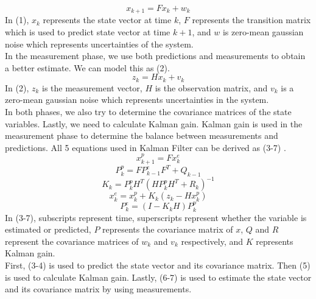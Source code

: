 \documentclass[12pt]{article}
\begin{document}
    \begin{equation}\label{eq:1}
        x_{k+1} = Fx_k + w_k
    \end{equation}
    In (1), \(x_k\) represents the state vector at time \(k\), \(F\) 
    represents the transition matrix which is used to predict state vector 
    at time \(k+1\), and \(w\) is zero-mean gaussian noise which represents 
    uncertainties of the system. \\
    In the measurement phase, we use both predictions and measurements to 
    obtain a better estimate. We can model this as (2).
    \begin{equation}\label{eq:2}
        z_k = Hx_k + v_k
    \end{equation}
    In (2), \(z_k\) is the measurement vector, \(H\) is the observation matrix,
    and \(v_k\) is a zero-mean gaussian noise which represents uncertainties 
    in the system. \\
    In both phases, we also try to determine the covariance matrices of 
    the state variables. Lastly, we need to calculate Kalman gain. 
    Kalman gain is used in the measurement phase to determine the balance 
    between measurements and predictions. All 5 equations used in Kalman 
    Filter can be derived as (3-7) \cite{kalman}.
    \begin{equation}\label{eq:3}
        x^{p}_{k+1} = Fx^{e}_k
    \end{equation}
    \begin{equation}\label{eq:4}
        P^{p}_{k} = FP^{e}_{k-1}F^T + Q_{k-1}
    \end{equation}
    \begin{equation}\label{eq:5}
        K_k = P^p_kH^T(HP^p_kH^T + R_k)^{-1}	
    \end{equation}
    \begin{equation}\label{eq:6}
        x^{e}_{k} = x^{p}_k + K_k(z_k - Hx^p_k)	
    \end{equation}
    \begin{equation}\label{eq:7}
        P^{e}_{k} = (I - K_kH)P^p_k	
    \end{equation}
    In (3-7), subscripts represent time, superscripts represent whether the 
    variable is estimated or predicted, \(P\) represents the covariance matrix 
    of \(x\), \(Q\) and \(R\) represent the covariance matrices of \(w_k\) and 
    \(v_k\) respectively, and \(K\) represents Kalman gain. \\
    First, (3-4) is used to predict the state vector and its covariance matrix. 
    Then (5) is used to calculate Kalman gain. Lastly, (6-7) is used to 
    estimate the state vector and its covariance matrix by using measurements. 
\end{document}
